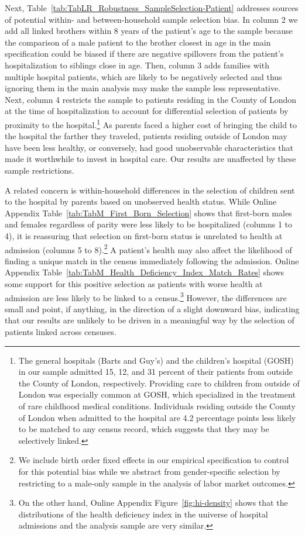 \documentclass[12pt,english]{article}
\begin{document}
Next, Table~\ref{tab:TabLR_Robustness_SampleSelection-Patient} addresses sources of potential within- and between-household sample selection bias. In column 2 we add all linked brothers within 8 years of the patient's age to the sample because the comparison of a male patient to the brother closest in age in the main specification could be biased if there are negative spillovers from the patient's hospitalization to siblings close in age. Then, column 3 adds families with multiple hospital patients, which are likely to be negatively selected and thus ignoring them in the main analysis may make the sample less representative. Next, column 4 restricts the sample to patients residing in the County of London at the time of hospitalization to account for differential selection of patients by proximity to the hospital.\footnote{The general hospitals (Barts and Guy's) and the children's hospital (GOSH) in our sample admitted 15, 12, and 31 percent of their patients from outside the County of London, respectively. Providing care to children from outside of London was especially common at GOSH, which specialized in the treatment of rare childhood medical conditions. Individuals residing outside the County of London when admitted to the hospital are 4.2 percentage points less likely to be matched to any census record, which suggests that they may be selectively linked.} As parents faced a higher cost of bringing the child to the hospital the farther they traveled, patients residing outside of London may have been less healthy, or conversely, had good unobservable characteristics that made it worthwhile to invest in hospital care. Our results are unaffected by these sample restrictions. 

A related concern is within-household differences in the selection of children sent to the hospital by parents based on unobserved health status. While  Online Appendix Table~\ref{tab:TabM_First_Born_Selection} shows that first-born males and females regardless of parity were less likely to be hospitalized (columns 1 to 4), it is reassuring that selection on first-born status is unrelated to health at admission (columns 5 to 8).\footnote{We include birth order fixed effects in our empirical specification to control for this potential bias while we abstract from gender-specific selection by restricting to a male-only sample in the analysis of labor market outcomes.} A patient's health may also affect the likelihood of finding a unique match in the census immediately following the admission. Online Appendix Table~\ref{tab:TabM_Health_Deficiency_Index_Match_Rates} shows some support for this positive selection as patients with worse health at admission are less likely to be linked to a census.\footnote{On the other hand, Online Appendix Figure~\ref{fig:hi-density} shows that the distributions of the health deficiency index in the universe of hospital admissions and the analysis sample are very similar.} However, the differences are small and point, if anything, in the direction of a slight downward bias, indicating that our results are unlikely to be driven in a meaningful way by the selection of patients linked across censuses.
\end{document}
